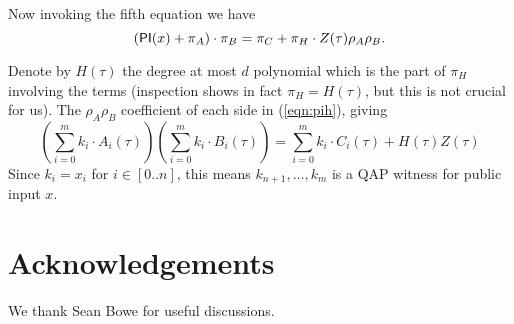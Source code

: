 \documentclass[11pt]{article}
\numberwithin{figure}{section} %
\begin{document}
Now invoking the fifth equation we have
\begin{equation}\label{eqn:pih}
(\mathsf{PI}(x)+\pi_A)\cdot \pi_B= \pi_C + \pi_H\cdot Z(\tau)\rho_A\rho_B. 
\end{equation}


Denote by $H(\tau)$ the degree at most $d$ polynomial which is the part of $\pi_H$ involving the terms
 (inspection shows in fact $\pi_H=H(\tau)$, but this is not crucial for us).
The $\rho_A\rho_B$ coefficient of each side in (\ref{eqn:pih}), giving
\[\left(\sum_{i=0}^m k_i \cdot A_i(\tau)\right)\left(\sum_{i=0}^m k_i\cdot  B_i(\tau)\right) = \sum_{i=0}^m k_i\cdot C_i(\tau) + H(\tau)Z(\tau)\]
Since $k_i=x_i$ for $i\in [0..n]$, this means $k_{n+1},\ldots,k_m$ is a QAP witness for public input $x$.

\section*{Acknowledgements}
We thank Sean Bowe for useful discussions.


\end{document}
